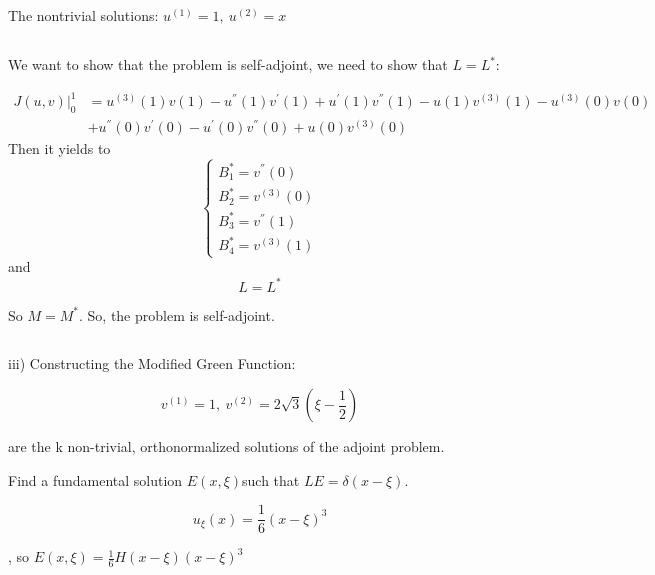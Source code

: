 \documentclass{article}
\begin{document}
\section{}
\subsection{}
The nontrivial solutions: $u^{(1)}=1,\ u^{(2)}=x$
\newpage
\subsection{}
We want to show that the problem is self-adjoint, we need to show that $L=L^*$:


\begin{align*}
	J\left(u,v\right){\vert{}}_0^1&=u^{\left(3\right)}\left(1\right)v\left(1\right)-u^{''}\left(1\right)v^{'}\left(1\right)+u^{'}\left(1\right)v^{''}\left(1\right)-u\left(1\right)v^{\left(3\right)}\left(1\right)-u^{\left(3\right)}\left(0\right)v\left(0\right)\\
&+u^{''}\left(0\right)v^{'}\left(0\right)-u^{'}\left(0\right)v^{''}\left(0\right)+u\left(0\right)v^{\left(3\right)}\left(0\right)
\end{align*}
Then it yields to
\[
\left\{\begin{array}{l}B_1^*=v^{''}\left(0\right) \\
B_2^*=v^{\left(3\right)}\left(0\right) \\
B_3^*=v^{''}\left(1\right) \\
B_4^*=v^{\left(3\right)}\left(1\right)\end{array}\right.
\]
and
\[
L=L^*
\]

So $M=M^*$. So, the problem is self-adjoint.
\subsection{}
iii) Constructing the Modified Green Function:

{\raggedright


\[
v^{\left(1\right)}=1,\ v^{\left(2\right)}=2\sqrt{3}(\xi{}-\frac{1}{2})
\]

are the k non-trivial, orthonormalized solutions of the adjoint problem.
}

{\raggedright
Find a fundamental solution $E\left(x,\xi{}\right)$such that
$LE=\delta{}(x-\xi{})$.
}

{\raggedright


\[
u_{\xi{}}\left(x\right)=\frac{1}{6}{\left(x-\xi{}\right)}^3
\]

, so $E\left(x,\xi{}\right)=\frac{1}{6}{H(x-\xi{})\left(x-\xi{}\right)}^3$
}
\end{document}
